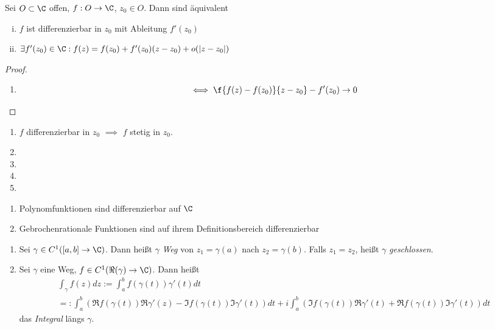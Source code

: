 \documentclass[a4paper,10pt]{scrartcl}
\begin{document}
\begin{st}
	\label{st:1.24}
	Sei $O\subset \C$ offen, $f:O\to \C$, $z_0\in O$.
	Dann sind äquivalent
	\begin{enumerate}[(i)]
		\item
			$f$ ist differenzierbar in $z_0$ mit Ableitung $f'(z_0)$
		\item
			$\exists f'(z_0) \in \C : f(z) =f(z_0)+f'(z_0)(z-z_0)+o(|z-z_0|)$
	\end{enumerate}
	\begin{proof}
		\begin{enumerate}
			\item 
				\[
					\iff \f{f(z)-f(z_0)}{z-z_0}-f'(z_0) \to 0
				\]
				\fixme
		\end{enumerate}
	\end{proof}
\end{st}

\begin{st}
	\label{1.25}
	\begin{enumerate}[1)]
		\item 
			$f$ differenzierbar in $z_0$ $\implies$ $f$ stetig in $z_0$.
		\item
		\item
		\item
		\item
	\end{enumerate}
\end{st}

\begin{ex}
	\begin{enumerate}[1)]
		\item 
			Polynomfunktionen sind differenzierbar auf $\C$
		\item
			Gebrochenrationale Funktionen sind auf ihrem Definitionsbereich differenzierbar
	\end{enumerate}
\end{ex}

\begin{df}
	\begin{enumerate}[1)]
		\item 
			Sei $\gamma\in C^1([a,b]\to \C)$.
			Dann heißt $\gamma$ \emph{Weg} von $z_1=\gamma(a)$ nach $z_2=\gamma(b)$.
			Falls $z_1=z_2$, heißt $\gamma$ \emph{geschlossen}.
		\item
			Sei $\gamma$ eine Weg, $f\in C^1(\Re(\gamma)\to \C)$.
			Dann heißt
			\begin{align*}
				\int_\gamma f(z) dz := \int_a^b f(\gamma(t)) \gamma'(t) dt\\
				=: \int_a^b(\Re f(\gamma(t)) \Re \gamma'(z) - \Im f(\gamma(t)) \Im \gamma'(t))dt
				+ i\int_a^b(\Im f(\gamma(t)) \Re \gamma'(t) + \Re f(\gamma(t)) \Im \gamma'(t))dt
			\end{align*}
			das \emph{Integral} längs $\gamma$.
	\end{enumerate}
\end{df}
\end{document}
